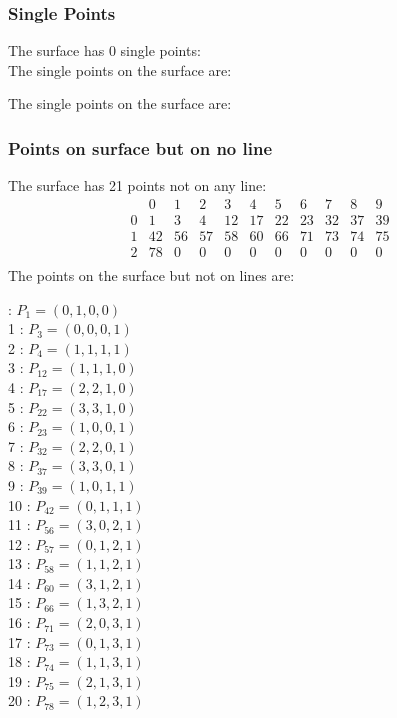 \documentclass{article}
\begin{document}
{\subsubsection*{Single Points}
The surface has 0 single points:\\
The single points on the surface are:\\
\begin{multicols}{2}
\noindent
\end{multicols}
The single points on the surface are:\\
\subsubsection*{Points on surface but on no line}
The surface has 21 points not on any line:\\
$$
\begin{array}{r|*{10}{r}}
 & 0 & 1 & 2 & 3 & 4 & 5 & 6 & 7 & 8 & 9\\
\hline
0 & 1 & 3 & 4 & 12 & 17 & 22 & 23 & 32 & 37 & 39\\
1 & 42 & 56 & 57 & 58 & 60 & 66 & 71 & 73 & 74 & 75\\
2 & 78 & 0 & 0 & 0 & 0 & 0 & 0 & 0 & 0 & 0\\
\end{array}
$$
The points on the surface but not on lines are:\\
\begin{multicols}{2}
 : $P_{1}=( 0, 1, 0, 0 )$\\
1 : $P_{3}=( 0, 0, 0, 1 )$\\
2 : $P_{4}=( 1, 1, 1, 1 )$\\
3 : $P_{12}=( 1, 1, 1, 0 )$\\
4 : $P_{17}=( 2, 2, 1, 0 )$\\
5 : $P_{22}=( 3, 3, 1, 0 )$\\
6 : $P_{23}=( 1, 0, 0, 1 )$\\
7 : $P_{32}=( 2, 2, 0, 1 )$\\
8 : $P_{37}=( 3, 3, 0, 1 )$\\
9 : $P_{39}=( 1, 0, 1, 1 )$\\
10 : $P_{42}=( 0, 1, 1, 1 )$\\
11 : $P_{56}=( 3, 0, 2, 1 )$\\
12 : $P_{57}=( 0, 1, 2, 1 )$\\
13 : $P_{58}=( 1, 1, 2, 1 )$\\
14 : $P_{60}=( 3, 1, 2, 1 )$\\
15 : $P_{66}=( 1, 3, 2, 1 )$\\
16 : $P_{71}=( 2, 0, 3, 1 )$\\
17 : $P_{73}=( 0, 1, 3, 1 )$\\
18 : $P_{74}=( 1, 1, 3, 1 )$\\
19 : $P_{75}=( 2, 1, 3, 1 )$\\
20 : $P_{78}=( 1, 2, 3, 1 )$\\
\end{multicols}
}
\end{document}
